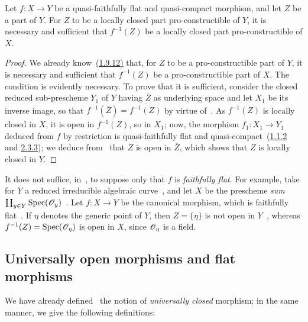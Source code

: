 \begin{corollary}[2.3.14]
\label{IV.2.3.14}
Let $f:X\to Y$ be a quasi-faithfully flat and quasi-compact morphism, and let $Z$ be a part of $Y$.
For $Z$ to be a locally closed part pro-constructible of $Y$, it is necessary and sufficient that $f^{-1}(Z)$ be a locally closed part pro-constructible of $X$.
\end{corollary}

\begin{proof}
We already know~{\hyperref[IV.1.9.12]{(1.9.12)}} that, for $Z$ to be a pro-constructible part of $Y$, it is necessary and sufficient that $f^{-1}(Z)$ be a pro-constructible part of $X$.
The condition is evidently necessary.
To prove that it is sufficient, consider the closed reduced sub-prescheme $Y_1$ of $Y$ having $\overline{Z}$ as underlying space and let $X_1$ be its inverse image, so that $f^{-1}(\overline{Z})=\overline{f^{-1}(Z)}$ by virtue of~.
As $f^{-1}(Z)$ is locally closed in $X$, it is open in $\overline{f^{-1}(Z)}$, so in $X_1$; now, the morphism $f_1:X_1\to Y_1$ deduced from $f$ by restriction is quasi-faithfully flat and quasi-compact~({\hyperref[IV.1.1.2]{1.1.2}} and {\hyperref[IV.2.3.3]{2.3.3}}); we deduce from~ that $Z$ is open in $\overline{Z}$, which shows that $Z$ is locally closed in $Y$.
\end{proof}

\begin{remark}[2.3.15]
\label{IV.2.3.15}
It does not suffice, in~, to suppose only that $f$ is \emph{faithfully flat}.
For example, take for $Y$ a reduced irreducible algebraic curve~, and let
$X$ be the prescheme \emph{sum} $\coprod_{y\in Y}\operatorname{Spec}(\mathscr{O}_y)$~.
Let $f:X\to Y$ be the canonical morphism, which is faithfully flat~.
If $\eta$ denotes the generic point of $Y$, then $Z=\{\eta\}$ is not open in $Y$~, whereas $f^{-1}(Z)=\operatorname{Spec}(\mathscr{O}_\eta)$ is open in $X$, since $\mathscr{O}_\eta$ is a field.
\end{remark}

\subsection{Universally open morphisms and flat morphisms}
\label{subsection:IV.2.4}

\begin{env}[2.4.1]
\label{IV.2.4.1}
We have already defined~ the notion of \emph{universally closed} morphism; in the same manner, we give the following definitions:
\end{env}

